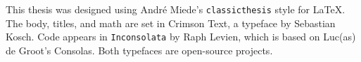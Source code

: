 This thesis was designed using Andr\'e Miede's
\texttt{classicthesis} style for \LaTeX.
The body, titles, and math are set in Crimson Text, a typeface by Sebastian Kosch.
Code appears in \texttt{Inconsolata} by Raph Levien, which is based on Luc(as)
de Groot's Consolas.
Both typefaces are open-source projects.
